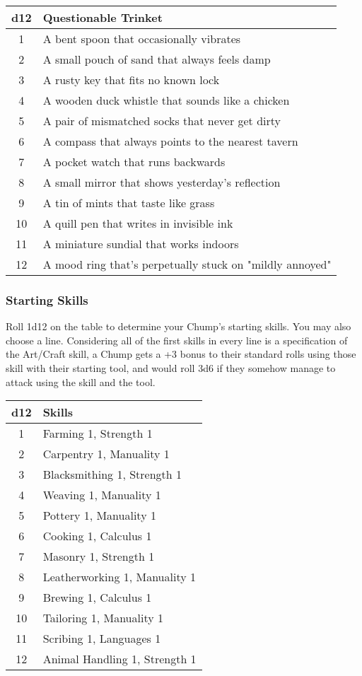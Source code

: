\begin{multicols}{2}
\begin{adjustbox}{width=0.95\columnwidth,center}
\begin{tabular}{|c|l|}
\hline
\textbf{d12} & \textbf{Questionable Trinket} \\
\hline
1 & A bent spoon that occasionally vibrates \\
2 & A small pouch of sand that always feels damp \\
3 & A rusty key that fits no known lock \\
4 & A wooden duck whistle that sounds like a chicken \\
5 & A pair of mismatched socks that never get dirty \\
6 & A compass that always points to the nearest tavern \\
7 & A pocket watch that runs backwards \\
8 & A small mirror that shows yesterday's reflection \\
9 & A tin of mints that taste like grass \\
10 & A quill pen that writes in invisible ink \\
11 & A miniature sundial that works indoors \\
12 & A mood ring that's perpetually stuck on "mildly annoyed" \\
\hline
\end{tabular}
\end{adjustbox}

\subsubsection*{Starting Skills}
Roll 1d12 on the table to determine your Chump's starting skills. You may also choose a line. Considering all of the first skills in every line is a specification of the Art/Craft skill, a Chump gets a +3 bonus to their standard rolls using those skill with their starting tool, and would roll 3d6 if they somehow manage to attack using the skill and the tool.

\begin{adjustbox}{width=0.75\columnwidth,center}
\begin{tabular}{|c|l|}
\hline
\textbf{d12} & \textbf{Skills} \\
\hline
1 & Farming 1, Strength 1 \\
2 & Carpentry 1, Manuality 1 \\
3 & Blacksmithing 1, Strength 1 \\
4 & Weaving 1, Manuality 1 \\
5 & Pottery 1, Manuality 1 \\
6 & Cooking 1, Calculus 1 \\
7 & Masonry 1, Strength 1 \\
8 & Leatherworking 1, Manuality 1 \\
9 & Brewing 1, Calculus 1 \\
10 & Tailoring 1, Manuality 1 \\
11 & Scribing 1, Languages 1 \\
12 & Animal Handling 1, Strength 1 \\
\hline
\end{tabular}
\end{adjustbox}


\end{multicols}
